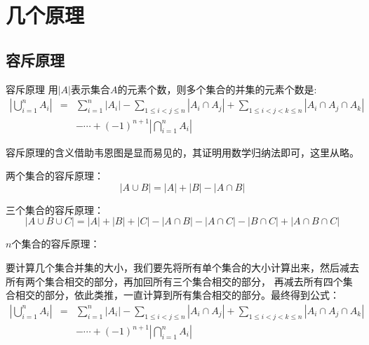 
\section{几个原理}
\label{sec:some-principle}

\subsection{容斥原理}
\label{subsec:inclusion-exclusion-principle}

\begin{myprinciple}{容斥原理}{}{\label{thm:inclusion-exclusion-principle}}
  用$|A|$表示集合$A$的元素个数，则多个集合的并集的元素个数是:
  \begin{eqnarray}
    \label{eq:inclusion-exclusion-principle}
    \left| \bigcup_{i=1}^nA_i \right| & = & \sum_{i=1}^n|A_i|-\sum_{1\leqslant i <j \leqslant n} \left| A_i \cap A_j \right| +\sum_{1 \leqslant i <j <k \leqslant n} \left| A_i\cap A_j \cap A_k \right| \nonumber \\
 & & -\cdots+(-1)^{n+1} \left| \bigcap_{i=1}^n A_i \right|
  \end{eqnarray}
\end{myprinciple}
容斥原理的含义借助韦恩图是显而易见的，其证明用数学归纳法即可，这里从略。

两个集合的容斥原理：
\begin{equation}
  \left | A \cup B \right | = \left | A \right | + \left | B \right | - \left | A \cap B \right |
\end{equation}

三个集合的容斥原理：
\begin{equation}
  \left | A \cup B \cup C \right | = \left | A \right | + \left | B \right | + \left | C \right | - \left | A \cap B \right | - \left | A \cap C \right | - \left | B \cap C \right | + \left | A \cap B \cap C \right |
\end{equation}

$n$个集合的容斥原理：

要计算几个集合并集的大小，我们要先将所有单个集合的大小计算出来，然后减去所有两个集合相交的部分，再加回所有三个集合相交的部分，
再减去所有四个集合相交的部分，依此类推，一直计算到所有集合相交的部分。最终得到公式：
\begin{eqnarray}
  \left| \bigcup_{i=1}^nA_i \right| & = & \sum_{i=1}^n|A_i|-\sum_{1\leqslant i <j \leqslant n} \left| A_i \cap A_j \right| +\sum_{1 \leqslant i <j <k \leqslant n} \left| A_i\cap A_j \cap A_k \right| \nonumber \\
 & & -\cdots+(-1)^{n+1} \left| \bigcap_{i=1}^n A_i \right|
\end{eqnarray}

